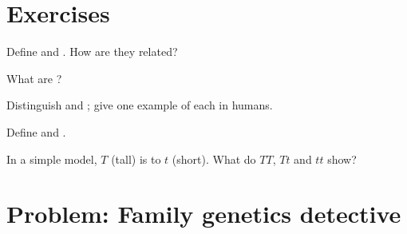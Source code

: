 \section{Exercises}

\begin{exercise}[$\star$]\label{exo:g8:genetics:1}
Define  and . How are they related?
\end{exercise}

\begin{exercise}[$\star$]\label{exo:g8:genetics:2}
What are ?
\end{exercise}

\begin{exercise}[$\star$]\label{exo:g8:genetics:3}
Distinguish  and ; give one example  of each in humans.
\end{exercise}

\begin{exercise}[$\star$]\label{exo:g8:genetics:4}
Define  and .
\end{exercise}

\begin{exercise}[$\star$]\label{exo:g8:genetics:5}
In a simple model, $T$ (tall) is  to $t$ (short). What 
do $TT$, $Tt$ and $tt$ show?
\end{exercise}

\section{Problem: Family genetics detective}

